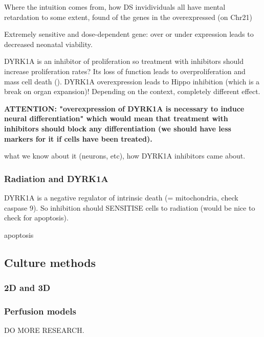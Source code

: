 \documentclass[onecolumn,10pt]{asme2ej}
\begin{document}
Where the intuition comes from, how DS invidividuals all have mental retardation to some extent, found of the genes in the overexpressed (on Chr21) 



Extremely sensitive and dose-dependent gene: over or under expression leads to decreased neonatal viability.  

DYRK1A is an inhibitor of proliferation so treatment with inhibitors should increase proliferation rates? 
Its loss of function leads to overproliferation and mass cell death (\cite{FernAndez-Martinez}).
DYRK1A overexpression leads to Hippo inhibition (which is a break on organ expansion)! Depending on the context, completely different effect.

\textbf{ATTENTION: "overexpression of DYRK1A is necessary to induce neural differentiation" which would mean that treatment with inhibitors should block any differentiation (we should have less markers for it if cells have been treated).} 

what we know about it (neurons, etc), how DYRK1A inhibitors came about.
\subsubsection{Radiation and DYRK1A}
DYRK1A is a negative regulator of intrinsic death (= mitochondria, check caspase 9). So inhibition should SENSITISE cells to radiation (would be nice to check for apoptosis). 


apoptosis
\subsection{Culture methods}
\subsubsection{2D and 3D}
\subsubsection{Perfusion models}
DO MORE RESEARCH.








\end{document}

